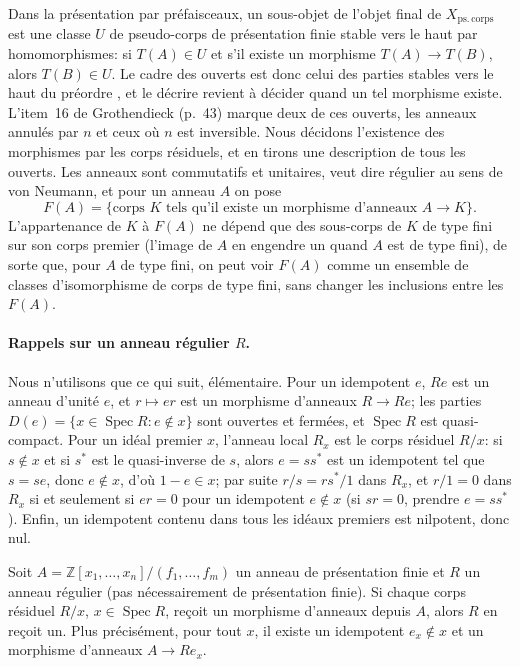 Dans la présentation par préfaisceaux, un sous-objet de l'objet final de $X_{\mathrm{ps.\,corps}}$ est une classe $U$ de pseudo-corps de présentation finie stable vers le haut par homomorphismes: si $T(A)\in U$ et s'il existe un morphisme $T(A)\to T(B)$, alors $T(B)\in U$. Le cadre des ouverts est donc celui des parties stables vers le haut du préordre , et le décrire revient à décider quand un tel morphisme existe. L'item~16 de Grothendieck (p.~43) marque deux de ces ouverts, les anneaux annulés par $n$ et ceux où $n$ est inversible. Nous décidons l'existence des morphismes par les corps résiduels, et en tirons une description de tous les ouverts. Les anneaux sont commutatifs et unitaires,  veut dire régulier au sens de von Neumann, et pour un anneau $A$ on pose
\[
F(A) = \{\text{corps } K \text{ tels qu'il existe un morphisme d'anneaux } A\to K\}.
\]
L'appartenance de $K$ à $F(A)$ ne dépend que des sous-corps de $K$ de type fini sur son corps premier (l'image de $A$ en engendre un quand $A$ est de type fini), de sorte que, pour $A$ de type fini, on peut voir $F(A)$ comme un ensemble de classes d'isomorphisme de corps de type fini, sans changer les inclusions entre les $F(A)$.

\paragraph{Rappels sur un anneau régulier $R$.} Nous n'utilisons que ce qui suit, élémentaire. Pour un idempotent $e$, $Re$ est un anneau d'unité $e$, et $r\mapsto er$ est un morphisme d'anneaux $R\to Re$; les parties $D(e) = \{x\in\operatorname{Spec}R : e\notin x\}$ sont ouvertes et fermées, et $\operatorname{Spec}R$ est quasi-compact. Pour un idéal premier $x$, l'anneau local $R_x$ est le corps résiduel $R/x$: si $s\notin x$ et si $s^*$ est le quasi-inverse de $s$, alors $e = ss^*$ est un idempotent tel que $s = se$, donc $e\notin x$, d'où $1-e\in x$; par suite $r/s = rs^*/1$ dans $R_x$, et $r/1 = 0$ dans $R_x$ si et seulement si $er = 0$ pour un idempotent $e\notin x$ (si $sr = 0$, prendre $e = ss^*$). Enfin, un idempotent contenu dans tous les idéaux premiers est nilpotent, donc nul.

\begin{lemma}\label{lem:pf-local}
Soit $A = \mathbb Z[x_1,\dots,x_n]/(f_1,\dots,f_m)$ un anneau de présentation finie et $R$ un anneau régulier (pas nécessairement de présentation finie). Si chaque corps résiduel $R/x$, $x\in\operatorname{Spec}R$, reçoit un morphisme d'anneaux depuis $A$, alors $R$ en reçoit un. Plus précisément, pour tout $x$, il existe un idempotent $e_x\notin x$ et un morphisme d'anneaux $A\to Re_x$.
\end{lemma}


